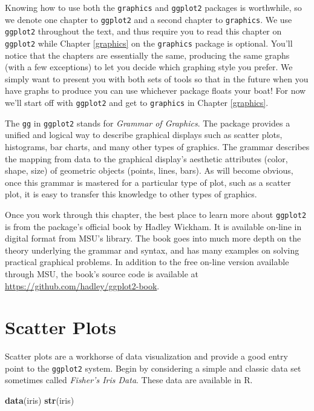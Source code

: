 \documentclass[
]{krantz}
\makeatletter
\newenvironment{Shaded}{\begin{snugshade}}{\end{snugshade}}
\newcommand{\KeywordTok}[1]{\textcolor[rgb]{0.27,0.27,0.27}{\textbf{#1}}}
\newcommand{\NormalTok}[1]{#1}
\newenvironment{kframe}{%
\medskip{}
\setlength{\fboxsep}{.8em}
 \def\at@end@of@kframe{}%
 \ifinner\ifhmode%
  \def\at@end@of@kframe{\end{minipage}}%
  \begin{minipage}{\columnwidth}%
 \fi\fi%
 \def\FrameCommand##1{\hskip\@totalleftmargin \hskip-\fboxsep
 \colorbox{shadecolor}{##1}\hskip-\fboxsep
     \hskip-\linewidth \hskip-\@totalleftmargin \hskip\columnwidth}%
 \MakeFramed {\advance\hsize-\width
   \@totalleftmargin\z@ \linewidth\hsize
   \@setminipage}}%
 {\par\unskip\endMakeFramed%
 \at@end@of@kframe}
\renewenvironment{Shaded}{\begin{kframe}}{\end{kframe}}
\makeatother
\begin{document}
Knowing how to use both the \texttt{graphics} and \texttt{ggplot2} packages is worthwhile, so we denote one chapter to \texttt{ggplot2} and a second chapter to \texttt{graphics}. We use \texttt{ggplot2} throughout the text, and thus require you to read this chapter on \texttt{ggplot2} while Chapter \ref{graphics} on the \texttt{graphics} package is optional. You'll notice that the chapters are essentially the same, producing the same graphs (with a few exceptions) to let you decide which graphing style you prefer. We simply want to present you with both sets of tools so that in the future when you have graphs to produce you can use whichever package floats your boat! For now we'll start off with \texttt{ggplot2} and get to \texttt{graphics} in Chapter \ref{graphics}.

The \texttt{gg} in \texttt{ggplot2} stands for \emph{Grammar of Graphics}. The package provides a unified and logical way to describe graphical displays such as scatter plots, histograms, bar charts, and many other types of graphics. The grammar describes the mapping from data to the graphical display's aesthetic attributes (color, shape, size) of geometric objects (points, lines, bars). As will become obvious, once this grammar is mastered for a particular type of plot, such as a scatter plot, it is easy to transfer this knowledge to other types of graphics.

Once you work through this chapter, the best place to learn more about \texttt{ggplot2} is from the package's official book \citet{WickhamGgplot2Book} by Hadley Wickham. It is available on-line in digital format from MSU's library. The book goes into much more depth on the theory underlying the grammar and syntax, and has many examples on solving practical graphical problems. In addition to the free on-line version available through MSU, the book's source code is available at \url{https://github.com/hadley/ggplot2-book}.

\hypertarget{scatter-plots}{%
\section{Scatter Plots}\label{scatter-plots}}

Scatter plots are a workhorse of data visualization and provide a good entry point to the \texttt{ggplot2} system. Begin by considering a simple and classic data set sometimes called \emph{Fisher's Iris Data}. These data are available in R.

\begin{Shaded}
\begin{Highlighting}[]
\KeywordTok{data}\NormalTok{(iris)}
\KeywordTok{str}\NormalTok{(iris)}
\end{Highlighting}
\end{Shaded}
\end{document}
